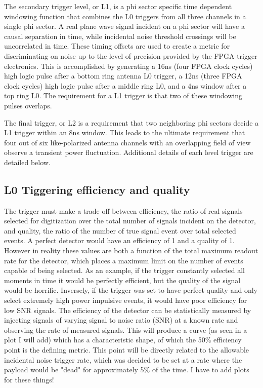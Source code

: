 		The secondary trigger level, or L1, is a phi sector specific time dependent windowing function that combines the L0 triggers from all three channels in a single phi sector.  A real plane wave signal incident on a phi sector will have a causal separation in time, while incidental noise threshold crossings will be uncorrelated in time.  These timing offsets are used to create a metric for discriminating on noise up to the level of precision provided by the FPGA trigger electronics.  This is accomplished by generating a 16ns (four FPGA clock cycles) high logic pulse after a bottom ring antenna L0 trigger, a 12ns (three FPGA clock cycles) high logic pulse after a middle ring L0, and a 4ns window after a top ring L0.  The requirement for a L1 trigger is that two of these windowing pulses overlaps.
		
		The final trigger, or L2 is a requirement that two neighboring phi sectors decide a L1 trigger within an 8ns window.  This leads to the ultimate requirement that four out of six like-polarized antenna channels with an overlapping field of view observe a transient power fluctuation.  Additional details of each level trigger are detailed below.
		

	\subsection{L0 Tiggering efficiency and quality}
		The trigger must make a trade off between efficiency, the ratio of real signals selected for digitization over the total number of signals incident on the detector, and quality, the ratio of the number of true signal event over total selected events.  A perfect detector would have an efficiency of 1 and a quality of 1.  However in reality these values are both a function of the total maximum readout rate for the detector, which places a maximum limit on the number of events capable of being selected.  As an example, if the trigger constantly selected all moments in time it would be perfectly efficient, but the quality of the signal would be horrific.  Inversely, if the trigger was set to have perfect quality and only select extremely high power impulsive events, it would have poor efficiency for low SNR signals.  The efficiency of the detector can be statistically measured by injecting signals of varying signal to noise ratio (SNR) at a known rate and observing the rate of measured signals.  This will produce a curve (as seen in a plot I will add) which has a characteristic shape, of which the 50\% efficiency point is the defining metric.  This point will be directly related to the allowable incidental noise trigger rate, which was decided to be set at a rate where the payload would be "dead" for approximately 5\% of the time.  I have to add plots for these things!
		
